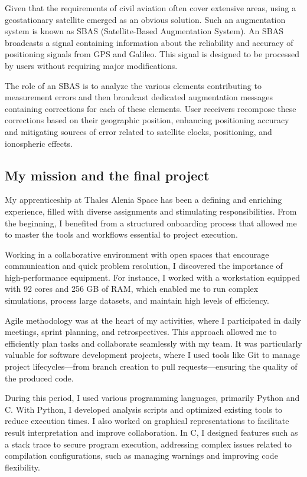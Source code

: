 Given that the requirements of civil aviation often cover extensive areas, using a geostationary satellite emerged as an obvious solution. Such an augmentation system is known as SBAS (Satellite-Based Augmentation System). An SBAS broadcasts a signal containing information about the reliability and accuracy of positioning signals from GPS and Galileo. This signal is designed to be processed by users without requiring major modifications.

The role of an SBAS is to analyze the various elements contributing to measurement errors and then broadcast dedicated augmentation messages containing corrections for each of these elements. User receivers recompose these corrections based on their geographic position, enhancing positioning accuracy and mitigating sources of error related to satellite clocks, positioning, and ionospheric effects.

\subsection{My mission and the final project}
 

My apprenticeship at Thales Alenia Space has been a defining and enriching experience, filled with diverse assignments and stimulating responsibilities. From the beginning, I benefited from a structured onboarding process that allowed me to master the tools and workflows essential to project execution.

Working in a collaborative environment with open spaces that encourage communication and quick problem resolution, I discovered the importance of high-performance equipment. For instance, I worked with a workstation equipped with 92 cores and 256 GB of RAM, which enabled me to run complex simulations, process large datasets, and maintain high levels of efficiency.

Agile methodology was at the heart of my activities, where I participated in daily meetings, sprint planning, and retrospectives. This approach allowed me to efficiently plan tasks and collaborate seamlessly with my team. It was particularly valuable for software development projects, where I used tools like Git to manage project lifecycles—from branch creation to pull requests—ensuring the quality of the produced code.

During this period, I used various programming languages, primarily Python and C. With Python, I developed analysis scripts and optimized existing tools to reduce execution times. I also worked on graphical representations to facilitate result interpretation and improve collaboration. In C, I designed features such as a stack trace to secure program execution, addressing complex issues related to compilation configurations, such as managing warnings and improving code flexibility.

